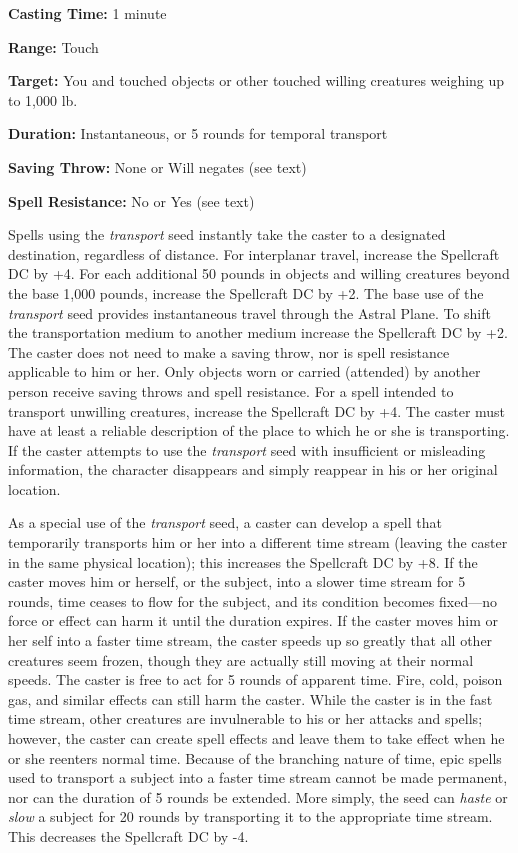\documentclass{article}
\begin{document}
\textbf{Casting Time:} 1 minute 

\textbf{Range:} Touch 

\textbf{Target:} You and touched objects or other touched willing creatures weighing 
up to 1,000 lb. 

\textbf{Duration:} Instantaneous, or 5 rounds for temporal transport 

\textbf{Saving Throw:} None or Will negates (see text) 

\textbf{Spell Resistance:} No or Yes (see text) 

Spells using the \textit{transport }seed instantly take the caster to a designated 
destination, regardless of distance. For interplanar travel, increase the Spellcraft 
DC by +4. For each additional 50 pounds in objects and willing creatures beyond 
the base 1,000 pounds, increase the Spellcraft DC by +2. The base use of the \textit{transport 
}seed provides instantaneous travel through the Astral Plane. To shift the transportation 
medium to another medium increase the Spellcraft DC by +2. The caster does not 
need to make a saving throw, nor is spell resistance applicable to him or her. 
Only objects worn or carried (attended) by another person receive saving throws 
and spell resistance. For a spell intended to transport unwilling creatures, increase 
the Spellcraft DC by +4. The caster must have at least a reliable description of 
the place to which he or she is transporting. If the caster attempts to use the 
\textit{transport }seed with insufficient or misleading information, the character 
disappears and simply reappear in his or her original location. 

As a special use of the \textit{transport }seed, a caster can develop a spell that 
temporarily transports him or her into a different time stream (leaving the caster 
in the same physical location); this increases the Spellcraft DC by +8. If the 
caster moves him or herself, or the subject, into a slower time stream for 5 rounds, 
time ceases to flow for the subject, and its condition becomes fixed---no force 
or effect can harm it until the duration expires. If the caster moves him or her 
self into a faster time stream, the caster speeds up so greatly that all other 
creatures seem frozen, though they are actually still moving at their normal speeds. 
The caster is free to act for 5 rounds of apparent time. Fire, cold, poison gas, 
and similar effects can still harm the caster. While the caster is in the fast 
time stream, other creatures are invulnerable to his or her attacks and spells; 
however, the caster can create spell effects and leave them to take effect when 
he or she reenters normal time. Because of the branching nature of time, epic spells 
used to transport a subject into a faster time stream cannot be made permanent, 
nor can the duration of 5 rounds be extended. More simply, the seed can \textit{haste 
}or \textit{slow }a subject for 20 rounds by transporting it to the appropriate 
time stream. This decreases the Spellcraft DC by -4. 
\end{document}
